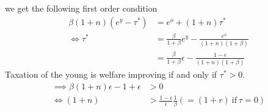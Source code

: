 we get the following first order condition
\begin{align*}
  \beta (1 + n) (e^y - \tau^*) &= e^o + (1 + n) \tau^* \\
  \iff \tau^* &= \frac{\beta}{1 + \beta} e^y - \frac{e^o}{(1 + n)(1 + \beta)} \\
            &= \frac{\beta}{1 + \beta} \epsilon - \frac{1 - \epsilon}{(1 + n)(1 + \beta)}
\end{align*}
Taxation of the young is welfare improving if and only if $\tau^* > 0$.
\begin{align*}
  \implies \beta (1 + n) \epsilon - 1 + \epsilon &> 0 \\
  \iff (1 + n) &> \frac{1 - \epsilon}{\epsilon} \frac{1}{\beta}  \left( = (1 + r)
                 ~\text{if}~\tau = 0 \right)
\end{align*}


